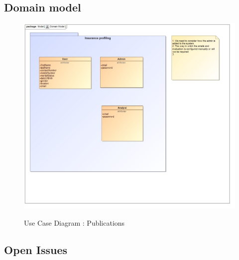 \documentclass{article}
\begin{document}
\subsection{Domain model}

\begin{figure}[H]
\includegraphics[width=\textwidth]{images/class__Domain_Model.jpg}  \\
\caption{Use Case Diagram : Publications}
\end{figure}

\subsection{Open Issues}
\end{document}
